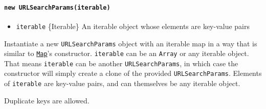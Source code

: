 \begin{Shaded}
\begin{Highlighting}[]
\OperatorTok{=}  \NormalTok{(\{}
  \OperatorTok{:} \OperatorTok{,}
  \OperatorTok{:}\NormalTok{ [}\OperatorTok{,} \NormalTok{]}\OperatorTok{,}
\NormalTok{\})}\OperatorTok{;}
\NormalTok{(}\NormalTok{))}\OperatorTok{;}
\NormalTok{())}\OperatorTok{;}
\end{Highlighting}
\end{Shaded}

\paragraph{\texorpdfstring{\texttt{new\ URLSearchParams(iterable)}}{new URLSearchParams(iterable)}}\label{new-urlsearchparamsiterable}

\begin{itemize}
\tightlist
\item
  \texttt{iterable} \{Iterable\} An iterable object whose elements are
  key-value pairs
\end{itemize}

Instantiate a new \texttt{URLSearchParams} object with an iterable map
in a way that is similar to
\href{https://developer.mozilla.org/en-US/docs/Web/JavaScript/Reference/Global_Objects/Map}{\texttt{Map}}'s
constructor. \texttt{iterable} can be an \texttt{Array} or any iterable
object. That means \texttt{iterable} can be another
\texttt{URLSearchParams}, in which case the constructor will simply
create a clone of the provided \texttt{URLSearchParams}. Elements of
\texttt{iterable} are key-value pairs, and can themselves be any
iterable object.

Duplicate keys are allowed.

